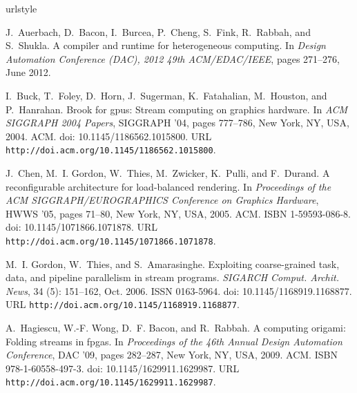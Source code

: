 \documentclass{sigplanconf}
\begin{document}
\begin{thebibliography}{}
\softraggedright
\providecommand{\natexlab}[1]{#1}
\providecommand{\url}[1]{\texttt{#1}}
\expandafter\ifx\csname urlstyle\endcsname\relax
  \providecommand{\doi}[1]{doi: #1}\else
  \providecommand{\doi}{doi: \begingroup \urlstyle{rm}\Url}\fi

J.~Auerbach, D.~Bacon, I.~Burcea, P.~Cheng, S.~Fink, R.~Rabbah, and S.~Shukla.
\newblock A compiler and runtime for heterogeneous computing.
\newblock In \emph{Design Automation Conference (DAC), 2012 49th
  ACM/EDAC/IEEE}, pages 271--276, June 2012.

I.~Buck, T.~Foley, D.~Horn, J.~Sugerman, K.~Fatahalian, M.~Houston, and
  P.~Hanrahan.
\newblock Brook for gpus: Stream computing on graphics hardware.
\newblock In \emph{ACM SIGGRAPH 2004 Papers}, SIGGRAPH '04, pages 777--786, New
  York, NY, USA, 2004. ACM.
\newblock \doi{10.1145/1186562.1015800}.
\newblock URL \url{http://doi.acm.org/10.1145/1186562.1015800}.

J.~Chen, M.~I. Gordon, W.~Thies, M.~Zwicker, K.~Pulli, and F.~Durand.
\newblock A reconfigurable architecture for load-balanced rendering.
\newblock In \emph{Proceedings of the ACM SIGGRAPH/EUROGRAPHICS Conference on
  Graphics Hardware}, HWWS '05, pages 71--80, New York, NY, USA, 2005. ACM.
\newblock ISBN 1-59593-086-8.
\newblock \doi{10.1145/1071866.1071878}.
\newblock URL \url{http://doi.acm.org/10.1145/1071866.1071878}.

M.~I. Gordon, W.~Thies, and S.~Amarasinghe.
\newblock Exploiting coarse-grained task, data, and pipeline parallelism in
  stream programs.
\newblock \emph{SIGARCH Comput. Archit. News}, 34 (5):
  151--162, Oct. 2006.
\newblock ISSN 0163-5964.
\newblock \doi{10.1145/1168919.1168877}.
\newblock URL \url{http://doi.acm.org/10.1145/1168919.1168877}.

A.~Hagiescu, W.-F. Wong, D.~F. Bacon, and R.~Rabbah.
\newblock A computing origami: Folding streams in fpgas.
\newblock In \emph{Proceedings of the 46th Annual Design Automation
  Conference}, DAC '09, pages 282--287, New York, NY, USA, 2009. ACM.
\newblock ISBN 978-1-60558-497-3.
\newblock \doi{10.1145/1629911.1629987}.
\newblock URL \url{http://doi.acm.org/10.1145/1629911.1629987}.


\end{thebibliography}
\end{document}
